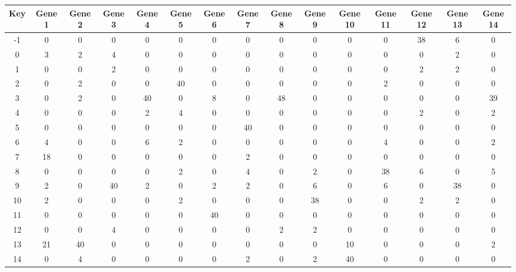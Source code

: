 \begin{tabular}{|c|c|c|c|c|c|c|c|c|c|c|c|c|c|c|}
\hline
Key & Gene 1 & Gene 2 & Gene 3 & Gene 4 & Gene 5 & Gene 6 & Gene 7 & Gene 8 & Gene 9 & Gene 10 & Gene 11 & Gene 12 & Gene 13 & Gene 14 \\
\hline
-1 & 0 & 0 & 0 & 0 & 0 & 0 & 0 & 0 & 0 & 0 & 0 & 38 & 6 & 0 \\
0 & 3 & 2 & 4 & 0 & 0 & 0 & 0 & 0 & 0 & 0 & 0 & 0 & 2 & 0 \\
1 & 0 & 0 & 2 & 0 & 0 & 0 & 0 & 0 & 0 & 0 & 0 & 2 & 2 & 0 \\
2 & 0 & 2 & 0 & 0 & 40 & 0 & 0 & 0 & 0 & 0 & 2 & 0 & 0 & 0 \\
3 & 0 & 2 & 0 & 40 & 0 & 8 & 0 & 48 & 0 & 0 & 0 & 0 & 0 & 39 \\
4 & 0 & 0 & 0 & 2 & 4 & 0 & 0 & 0 & 0 & 0 & 0 & 2 & 0 & 2 \\
5 & 0 & 0 & 0 & 0 & 0 & 0 & 40 & 0 & 0 & 0 & 0 & 0 & 0 & 0 \\
6 & 4 & 0 & 0 & 6 & 2 & 0 & 0 & 0 & 0 & 0 & 4 & 0 & 0 & 2 \\
7 & 18 & 0 & 0 & 0 & 0 & 0 & 2 & 0 & 0 & 0 & 0 & 0 & 0 & 0 \\
8 & 0 & 0 & 0 & 0 & 2 & 0 & 4 & 0 & 2 & 0 & 38 & 6 & 0 & 5 \\
9 & 2 & 0 & 40 & 2 & 0 & 2 & 2 & 0 & 6 & 0 & 6 & 0 & 38 & 0 \\
10 & 2 & 0 & 0 & 0 & 2 & 0 & 0 & 0 & 38 & 0 & 0 & 2 & 2 & 0 \\
11 & 0 & 0 & 0 & 0 & 0 & 40 & 0 & 0 & 0 & 0 & 0 & 0 & 0 & 0 \\
12 & 0 & 0 & 4 & 0 & 0 & 0 & 0 & 2 & 2 & 0 & 0 & 0 & 0 & 0 \\
13 & 21 & 40 & 0 & 0 & 0 & 0 & 0 & 0 & 0 & 10 & 0 & 0 & 0 & 2 \\
14 & 0 & 4 & 0 & 0 & 0 & 0 & 2 & 0 & 2 & 40 & 0 & 0 & 0 & 0 \\
\hline
\end{tabular}
